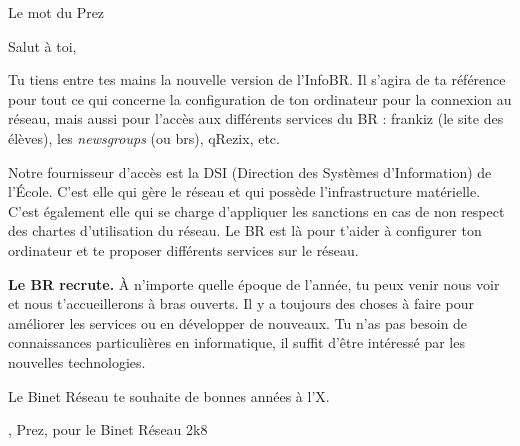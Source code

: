 

\begin{center}
    { \Huge Le mot du Prez }
\end{center}

 Salut \`a toi,

Tu tiens entre tes mains la nouvelle version de l'InfoBR. Il s'agira de ta r\'ef\'erence pour tout ce qui concerne la configuration de ton ordinateur pour la connexion au r\'eseau, mais aussi pour l'acc\`es aux diff\'erents services du BR : frankiz (le site des \'el\`eves), les \emph{newsgroups} (ou brs), qRezix, etc.

Notre fournisseur d'acc\`es est la DSI (Direction des Syst\`emes d'Information) de l'\'Ecole. C'est elle qui g\`ere le r\'eseau et qui poss\`ede l'infrastructure mat\'erielle. C'est \'egalement elle qui se charge d'appliquer les sanctions en cas de non respect des chartes d'utilisation du r\'eseau. Le BR est l\`a pour t'aider \`a configurer ton ordinateur et te proposer diff\'erents services sur le r\'eseau.

\textbf{Le BR recrute.} \`A n'importe quelle \'epoque de l'ann\'ee, tu peux venir nous voir et nous t'accueillerons \`a bras ouverts. Il y a toujours des choses \`a faire pour am\'eliorer les services ou en d\'evelopper de nouveaux. Tu n'as pas besoin de connaissances particuli\`eres en informatique, il suffit d'\^etre int\'eress\'e par les nouvelles technologies.

Le Binet R\'eseau te souhaite de bonnes ann\'ees \`a l'X.\\

\begin{flushright}
    , Prez, pour le Binet R\'eseau 2k8 
\end{flushright}

